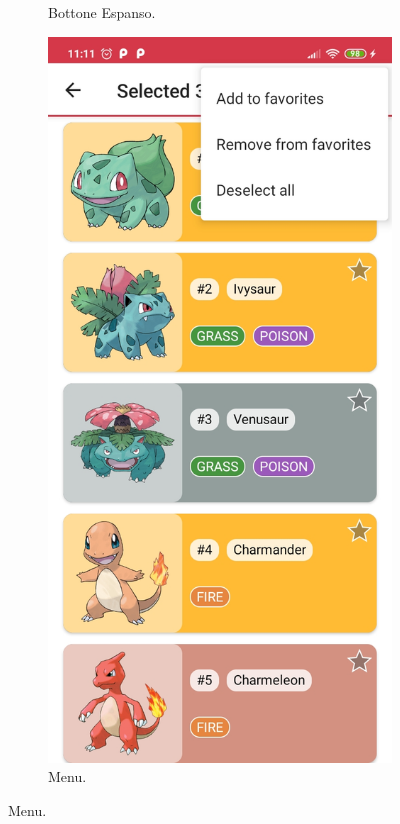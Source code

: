 \documentclass[a4paper,11pt]{article}
\begin{document}
\begin{figure}[h!]
{\begin{subfigure}[b]{0.3\linewidth}
    \caption{Bottone Espanso.}
  \end{subfigure}
  \begin{subfigure}[b]{0.3\linewidth}
    \includegraphics[width=\linewidth]{drop_down.jpg}
    \caption{Menu.}
  \end{subfigure}
  \label{fig:home}
  }
\end{figure}
\newpage
\end{document}
